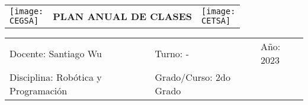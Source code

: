 \documentclass[landscape, a4paper, 10pt]{article}
\newcommand{\profesor}{Santiago Wu}
\newcommand{\discipline}{Robótica y Programación}
\newcommand{\currentyear}{2023}
\newcommand{\group}{2do Grado}
\newcommand{\CEGSA}{cegsa-logo.png}
\newcommand{\CETSA}{cetsa-logo.png}
\begin{document}
	\begin{tabularx}{\textwidth}{ >{\raggedright\arraybackslash}X >{\centering\arraybackslash}X >{\raggedleft\arraybackslash}X }
		\texttt{[image: \\CEGSA]} &
		\textbf{PLAN ANUAL DE CLASES} &
		\texttt{[image: \\CETSA]}
	\end{tabularx}
	\begin{tabularx}{\textwidth}{ >{\raggedright\arraybackslash}X >{\raggedright\arraybackslash}X >{\raggedright\arraybackslash}X }
		Docente: \profesor &
		Turno: - &
		Año: \currentyear \\
		Disciplina: \discipline &
		Grado/Curso: \group &
		 \\
	\end{tabularx}
	\centering
\end{document}
